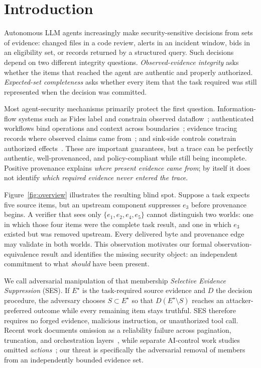 \documentclass[journal,compsoc]{IEEEtran}
\begin{document}
\section{Introduction}
Autonomous LLM agents increasingly make security-sensitive decisions from sets of evidence: changed files in a code review, alerts in an incident window, bids in an eligibility set, or records returned by a structured query. Such decisions depend on two different integrity questions. \emph{Observed-evidence integrity} asks whether the items that reached the agent are authentic and properly authorized. \emph{Expected-set completeness} asks whether every item that the task required was still represented when the decision was committed.

Most agent-security mechanisms primarily protect the first question. Information-flow systems such as Fides label and constrain observed dataflow~\cite{costa2025fides}; authenticated workflows bind operations and context across boundaries~\cite{rajagopalan2026authenticated}; evidence tracing records where observed claims came from~\cite{wang2026traces}; and sink-side controls constrain authorized effects~\cite{santos2026cxi}. These are important guarantees, but a trace can be perfectly authentic, well-provenanced, and policy-compliant while still being incomplete. Positive provenance explains \emph{where present evidence came from}; by itself it does not identify \emph{which required evidence never entered the trace}.

Figure~\ref{fig:overview} illustrates the resulting blind spot. Suppose a task expects five source items, but an upstream component suppresses $e_3$ before provenance begins. A verifier that sees only $\{e_1,e_2,e_4,e_5\}$ cannot distinguish two worlds: one in which those four items were the complete task result, and one in which $e_3$ existed but was removed upstream. Every delivered byte and provenance edge may validate in both worlds. This observation motivates our formal observation-equivalence result and identifies the missing security object: an independent commitment to what \emph{should} have been present.

We call adversarial manipulation of that membership \emph{Selective Evidence Suppression} (SES). If $E^\star$ is the task-required source evidence and $D$ the decision procedure, the adversary chooses $S\subset E^\star$ so that $D(E^\star\setminus S)$ reaches an attacker-preferred outcome while every remaining item stays truthful. SES therefore requires no forged evidence, malicious instruction, or unauthorized tool call. Recent work documents omission as a reliability failure across pagination, truncation, and orchestration layers~\cite{rajan2026missing}, while separate AI-control work studies omitted \emph{actions}~\cite{kemeklis2026omission}; our threat is specifically the adversarial removal of members from an independently bounded evidence set.
\end{document}
